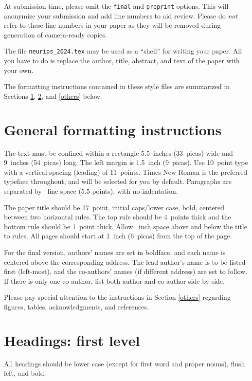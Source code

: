 \documentclass{article}
\begin{document}
At submission time, please omit the \verb+final+ and \verb+preprint+
options. This will anonymize your submission and add line numbers to aid
review. Please do \emph{not} refer to these line numbers in your paper as they
will be removed during generation of camera-ready copies.


The file \verb+neurips_2024.tex+ may be used as a ``shell'' for writing your
paper. All you have to do is replace the author, title, abstract, and text of
the paper with your own.


The formatting instructions contained in these style files are summarized in
Sections \ref{gen_inst}, \ref{headings}, and \ref{others} below.


\section{General formatting instructions}
\label{gen_inst}


The text must be confined within a rectangle 5.5~inches (33~picas) wide and
9~inches (54~picas) long. The left margin is 1.5~inch (9~picas).  Use 10~point
type with a vertical spacing (leading) of 11~points.  Times New Roman is the
preferred typeface throughout, and will be selected for you by default.
Paragraphs are separated by ~line space (5.5 points), with no
indentation.


The paper title should be 17~point, initial caps/lower case, bold, centered
between two horizontal rules. The top rule should be 4~points thick and the
bottom rule should be 1~point thick. Allow ~inch space above and
below the title to rules. All pages should start at 1~inch (6~picas) from the
top of the page.


For the final version, authors' names are set in boldface, and each name is
centered above the corresponding address. The lead author's name is to be listed
first (left-most), and the co-authors' names (if different address) are set to
follow. If there is only one co-author, list both author and co-author side by
side.

Please pay special attention to the instructions in Section \ref{others}
regarding figures, tables, acknowledgments, and references.


\section{Headings: first level}
\label{headings}


All headings should be lower case (except for first word and proper nouns),
flush left, and bold.
\end{document}
